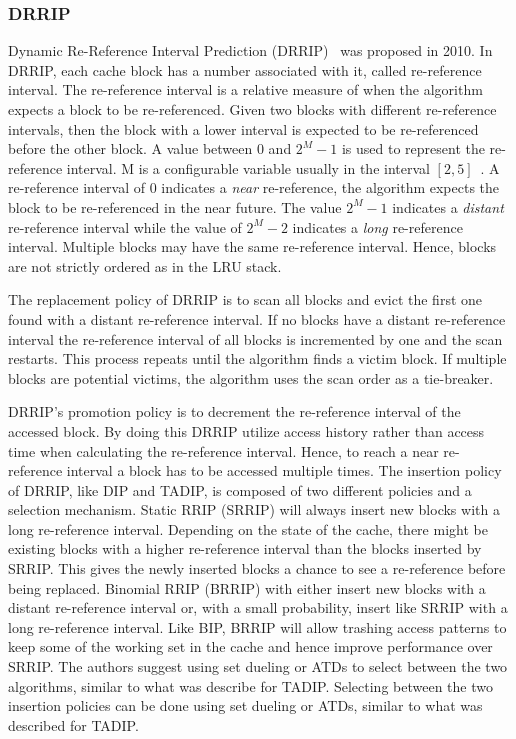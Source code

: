 \subsubsection{DRRIP}

Dynamic Re-Reference Interval Prediction (DRRIP)~\cite{Jaleel2010} was proposed in 2010.
In DRRIP, each cache block has a number associated with it, called re-reference interval.
The re-reference interval is a relative measure of when the algorithm expects a block to be re-referenced.
Given two blocks with different re-reference intervals, then the block with a lower interval is expected to be re-referenced before the other block.
A value between 0 and $2^M - 1$ is used to represent the re-reference interval.
M is a configurable variable usually in the interval $[2, 5]$~\cite{Jaleel2010}.
A re-reference interval of 0 indicates a \textit{near} re-reference, the algorithm expects the block to be re-referenced in the near future.
The value $2^M - 1$ indicates a \textit{distant} re-reference interval while the value of $2^M - 2$ indicates a \textit{long} re-reference interval.
Multiple blocks may have the same re-reference interval. 
Hence, blocks are not strictly ordered as in the LRU stack.

The replacement policy of DRRIP is to scan all blocks and evict the first one found with a distant re-reference interval.
If no blocks have a distant re-reference interval the re-reference interval of all blocks is incremented by one and the scan restarts.
This process repeats until the algorithm finds a victim block.
If multiple blocks are potential victims, the algorithm uses the scan order as a tie-breaker.

DRRIP's promotion policy is to decrement the re-reference interval of the accessed block.
By doing this DRRIP utilize access history rather than access time when calculating the re-reference interval.
Hence, to reach a near re-reference interval a block has to be accessed multiple times.
The insertion policy of DRRIP, like DIP and TADIP, is composed of two different policies and a selection mechanism.
Static RRIP (SRRIP) will always insert new blocks with a long re-reference interval. 
Depending on the state of the cache, there might be existing blocks with a higher re-reference interval than the blocks inserted by SRRIP.
This gives the newly inserted blocks a chance to see a re-reference before being replaced.
Binomial RRIP (BRRIP) with either insert new blocks with a distant re-reference interval or, with a small probability, insert like SRRIP with a long re-reference interval.
Like BIP, BRRIP will allow trashing access patterns to keep some of the working set in the cache and hence improve performance over SRRIP.
The authors suggest using set dueling or ATDs to select between the two algorithms, similar to what was describe for TADIP.
Selecting between the two insertion policies can be done using set dueling or ATDs, similar to what was described for TADIP.

